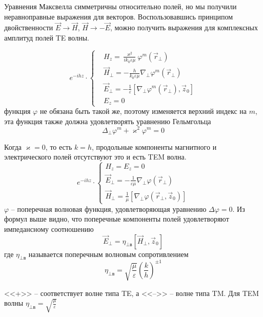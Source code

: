 \documentclass[a4paper,14pt]{extarticle}
\renewcommand{\phi}{\varphi}
\renewcommand{\epsilon}{\varepsilon}
\renewcommand{\kappa}{\varkappa}
\begin{document}
Уравнения Максвелла симметричны относительно полей, но мы получили неравноправные выражения для векторов. Воспользовавшись принципом двойственности $\vec{E}\to\vec{H}$,
$\vec{H}\to -\vec{E}$, можно получить выражения  для комплексных амплитуд полей TE волны. 

\begin{equation}
	e^{-ihz}\cdot\left\{
	\begin{aligned}
		&H_z = \frac{\kappa^2}{ik_0\epsilon\mu}\phi^m(\vec{r}_\perp) \\
		&\vec{H}_\perp = -\frac{h}{k_0\epsilon\mu}\nabla_\perp\phi^m(\vec{r}_\perp) \\
		&\vec{E}_\perp = -\frac{1}{\epsilon}[\nabla_\perp\phi^m(\vec{r}_\perp),\vec{z}_0] \\
		&E_z = 0
	\end{aligned}\right.
\end{equation}
функция $\phi$ не обязана быть такой же, поэтому изменяется верхний индекс на $m$, эта функция также должна удовлетворять уравнению Гельмгольца  
\begin{equation}
	\Delta_\perp\phi^{m} + \kappa^2\phi^{m}=0
\end{equation}

Когда $\kappa = 0$, то есть $k=h$, продольные компоненты магнитного и электрического полей отсутствуют это и есть TEM волна.
\begin{equation}
	e^{-ihz}\cdot\left\{
	\begin{aligned}
		H_z = E_z = 0\\
		\vec{E}_\perp = -\frac{1}{\epsilon\mu}\nabla_\perp\phi(\vec{r}_\perp)\\
		\vec{H}_\perp = \frac{1}{\mu}[\nabla_\perp\phi(\vec{r}_\perp,\vec{z}_0)]
	\end{aligned}\right.
\end{equation}
$\phi$ -- поперечная волновая функция, удовлетворяющая уравнению $\Delta\phi=0$.
Из формул выше видно, что поперечные компоненты полей удовлетворяют импедансному соотношению
\begin{equation}
	\vec{E}_\perp = \eta_{\perp\text{в}}[\vec{H}_\perp,\vec{z}_0]
\end{equation}
где $\eta_{\perp\text{в}}$ называется поперечным волновым сопротивлением
\begin{equation}
	\eta_{\perp\text{в}}=\sqrt{\frac{\mu}{\epsilon}} \left( \frac{k}{h} \right)^{\pm 1}
\end{equation} 
	
<<+>> -- соответствует волне типа TE, а <<-->> -- волне типа TM. 
Для TEM волны $\displaystyle \eta_{\perp\text{в}}=\sqrt{\frac{\mu}{\epsilon}}$
\end{document}

